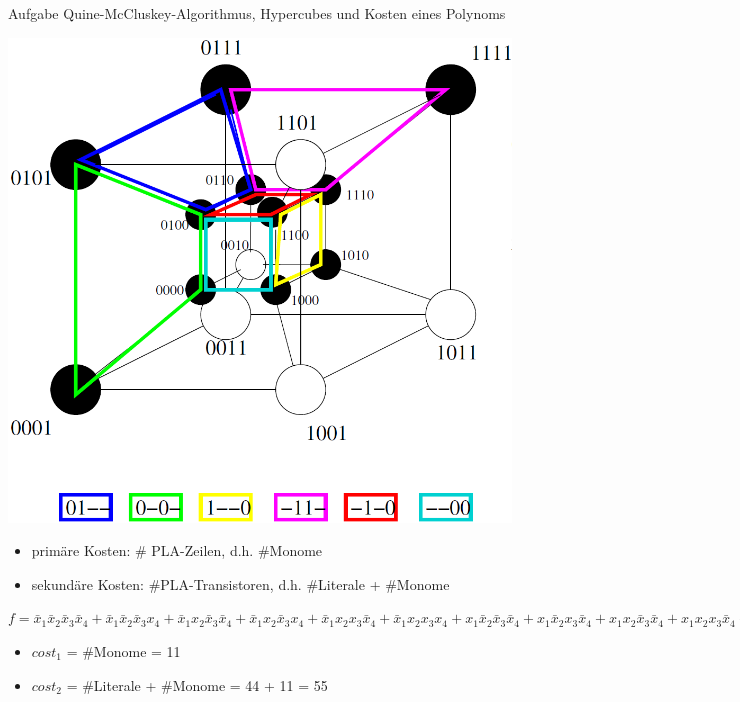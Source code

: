 \begin{frame}[allowframebreaks]{Aufgabe \thesection}{Quine-McCluskey-Algorithmus, Hypercubes und Kosten eines Polynoms}
    \begin{solution}
      \centering
        \includegraphics[height=0.6\textheight, center]{figures/HYpercube-Primimplikanten.png}
    \end{solution}

    \begin{solutionnoinc}
      \begin{itemize}
        \item \alert{primäre Kosten:} \# PLA-Zeilen, d.h. \#Monome
        \item \alert{sekundäre Kosten:} \#PLA-Transistoren, d.h. \#Literale + \#Monome
      \end{itemize}
    \end{solutionnoinc}

    \begin{solutionnoinc}
         \scriptsize $f = \bar x_1\bar x_2\bar x_3\bar x_4 + \bar x_1\bar x_2\bar x_3x_4 + \bar x_1x_2\bar x_3\bar x_4 + \bar x_1x_2\bar x_3x_4 + \bar x_1x_2x_3\bar x_4 + \bar x_1x_2x_3x_4 + x_1\bar x_2\bar x_3\bar x_4 + x_1\bar x_2x_3\bar x_4 +x_1x_2\bar x_3\bar x_4 +x_1x_2x_3\bar x_4 +x_1x_2x_3x_4$
        \begin{itemize}
          \item $cost_1$ = \#Monome = 11
          \item $cost_2$ = \#Literale + \#Monome = 44 + 11 = 55
        \end{itemize}
    \end{solutionnoinc}


\end{frame}
